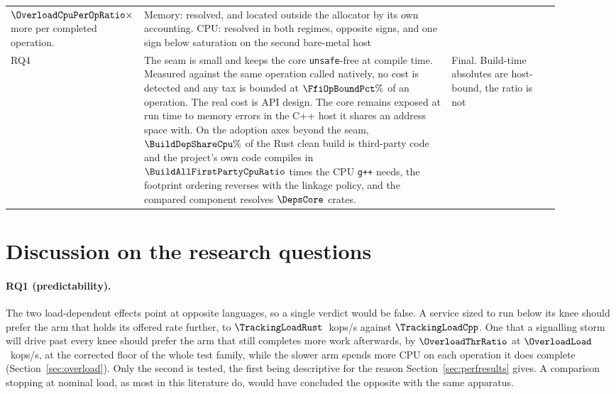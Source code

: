 \begin{table}[tp]
\begin{tabular}{@{}p{0.06\linewidth} p{0.62\linewidth} p{0.22\linewidth}@{}}
$\OverloadCpuPerOpRatio\times$ more per completed operation. & Memory: resolved, and located
outside the allocator by its own accounting. CPU: resolved in both regimes, opposite signs, and
one sign below saturation on the second bare-metal host \\
RQ4 & The seam is small and keeps the core \texttt{unsafe}-free at compile time. Measured against
the same operation called natively, no cost is detected and any tax is bounded at
$\FfiOpBoundPct\%$ of an operation. The real cost is API design. The core remains exposed at run
time to memory errors in the C++ host it shares an address space with. On the adoption axes beyond
the seam, $\BuildDepShareCpu\%$ of the Rust clean build is third-party code and the project's own
code compiles in $\BuildAllFirstPartyCpuRatio$ times the CPU \texttt{g++} needs, the footprint
ordering reverses with the linkage policy, and the compared component resolves $\DepsCore$ crates.
& Final. Build-time absolutes are host-bound, the ratio is not \\
\hline
\end{tabular}
\end{table}

\section{Discussion on the research questions}\label{sec:rqdiscussion}
\paragraph{RQ1 (predictability).} The two load-dependent effects point at opposite languages, so a
single verdict would be false. A service sized to run below its knee should prefer the arm that
holds its offered rate further, to $\TrackingLoadRust$~kops/s against $\TrackingLoadCpp$. One that
a signalling storm will drive past every knee should prefer the arm that still completes more work
afterwards, by $\OverloadThrRatio$ at $\OverloadLoad$~kops/s, at the corrected floor of the whole
test family, while the slower arm spends more CPU on each operation it does complete
(Section~\ref{sec:overload}). Only the second is tested, the first being descriptive for the
reason Section~\ref{sec:perfresults} gives. A comparison stopping at nominal load, as most in this
literature do, would have concluded the opposite with the same apparatus.

